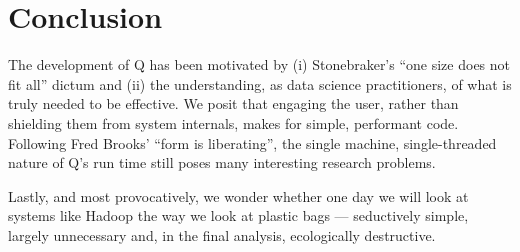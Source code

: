 \section{Conclusion}
\label{end}

The development of Q has been motivated by (i) 
Stonebraker's ``one size does not fit all'' dictum and (ii) the
understanding, as data science practitioners, of what is truly needed to be
effective. We posit that engaging the user, rather than shielding them from
system internals, makes for simple, performant code. 
Following Fred Brooks' ``form is liberating'', the single machine,
single-threaded nature of Q's run time still poses many interesting research
problems. 

Lastly, and most provocatively, we wonder whether one day we will look at
systems like Hadoop the way we look at plastic bags --- seductively simple,
largely unnecessary and, in the final analysis, ecologically destructive.
